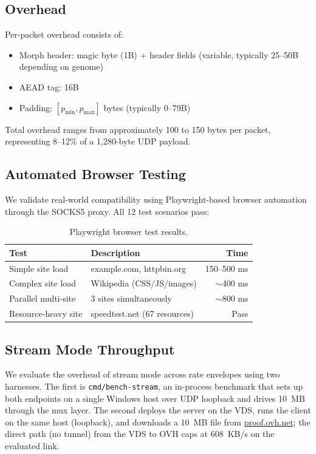 \documentclass[11pt,a4paper]{article}
\begin{document}
\subsection{Overhead}

Per-packet overhead consists of:
\begin{itemize}[nosep]
  \item Morph header: magic byte (1B) + header fields (variable, typically 25--50B depending on genome)
  \item AEAD tag: 16B
  \item Padding: $[p_{\min}, p_{\max}]$ bytes (typically 0--79B)
\end{itemize}

Total overhead ranges from approximately 100 to 150 bytes per packet, representing 8--12\% of a 1,280-byte UDP payload.

\subsection{Automated Browser Testing}

We validate real-world compatibility using Playwright-based browser automation through the SOCKS5 proxy. All 12 test scenarios pass:

\begin{table}[htbp]
\centering
\caption{Playwright browser test results.}
\label{tab:playwright}
\begin{tabular}{@{}llr@{}}
\toprule
\textbf{Test} & \textbf{Description} & \textbf{Time} \\
\midrule
Simple site load & example.com, httpbin.org & 150--500 ms \\
Complex site load & Wikipedia (CSS/JS/images) & $\sim$400 ms \\
Parallel multi-site & 3 sites simultaneously & $\sim$800 ms \\
Resource-heavy site & speedtest.net (67 resources) & Pass \\
\bottomrule
\end{tabular}
\end{table}

\subsection{Stream Mode Throughput}\label{sec:eval_stream}

We evaluate the overhead of stream mode across rate envelopes using two harnesses. The first is \texttt{cmd/bench-stream}, an in-process benchmark that sets up both endpoints on a single Windows host over UDP loopback and drives 10~MB through the mux layer. The second deploys the server on the VDS, runs the client on the same host (loopback), and downloads a 10~MB file from \url{proof.ovh.net}; the direct path (no tunnel) from the VDS to OVH caps at 608~KB/s on the evaluated link.
\end{document}
